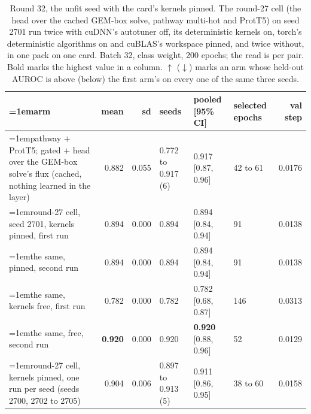 \begin{table}[H]
  \centering
  \scriptsize
  \setlength{\tabcolsep}{2.5pt}
  \caption[Round 32, the unfit seed with the card's kernels pinned]{Round 32, the unfit seed with the card's kernels pinned. The round-27 cell (the head over the cached GEM-box solve, pathway multi-hot and ProtT5) on seed 2701 run twice with cuDNN's autotuner off, its deterministic kernels on, torch's deterministic algorithms on and cuBLAS's workspace pinned, and twice without, in one pack on one card. Batch 32, class weight, 200 epochs; the read is per pair. Bold marks the highest value in a column. $\uparrow$ ($\downarrow$) marks an arm whose held-out AUROC is above (below) the first arm's on every one of the same three seeds.}
  \label{tab:w48}
  \begin{tabular}{@{}>{\raggedright\hangindent=1em\hangafter=1\arraybackslash}p{84.4mm}rrlllr@{}}
    \hline
    arm & mean & sd & seeds & pooled [95\% CI] & selected epochs & val step \\
    \hline
    pathway $+$ ProtT5; gated $+$ head over the GEM-box solve's flux (cached, nothing learned in the layer) & 0.882 & 0.055 & 0.772 to 0.917 (6) & 0.917 [0.87, 0.96] & 42 to 61 & 0.0176 \\
    round-27 cell, seed 2701, kernels pinned, first run & 0.894 & 0.000 & 0.894 & 0.894 [0.84, 0.94] & 91 & 0.0138 \\
    the same, pinned, second run & 0.894 & 0.000 & 0.894 & 0.894 [0.84, 0.94] & 91 & 0.0138 \\
    the same, kernels free, first run & 0.782 & 0.000 & 0.782 & 0.782 [0.68, 0.87] & 146 & 0.0313 \\
    the same, free, second run & \textbf{0.920} & 0.000 & 0.920 & \textbf{0.920} [0.88, 0.96] & 52 & 0.0129 \\
    round-27 cell, kernels pinned, one run per seed (seeds 2700, 2702 to 2705) & 0.904 & 0.006 & 0.897 to 0.913 (5) & 0.911 [0.86, 0.95] & 38 to 60 & 0.0158 \\
    \hline
  \end{tabular}
\end{table}
